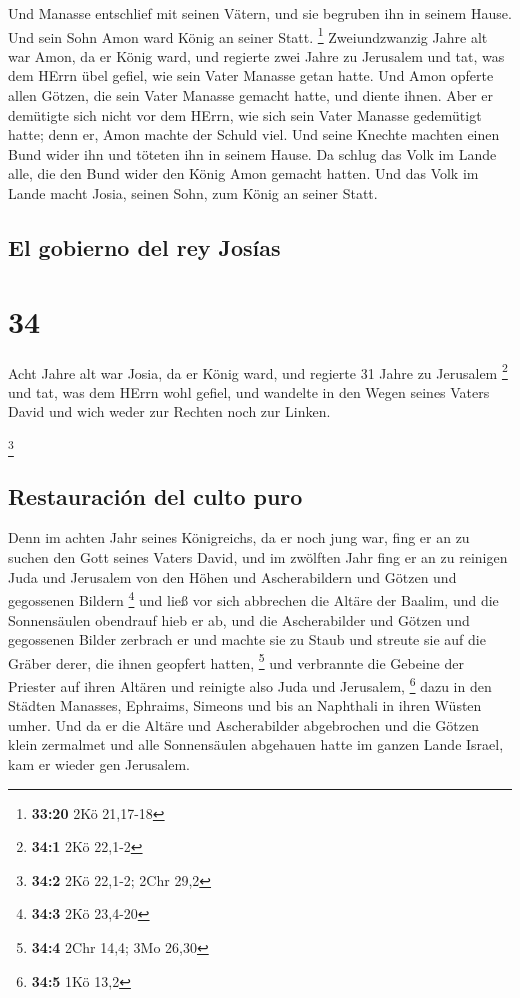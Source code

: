  Und Manasse entschlief mit seinen Vätern, und sie
begruben ihn in seinem Hause. Und sein Sohn Amon ward König an seiner
Statt. \footnote{\textbf{33:20} 2Kö 21,17-18} 
Zweiundzwanzig Jahre alt war Amon, da er König ward, und regierte zwei
Jahre zu Jerusalem  und tat, was dem HErrn übel gefiel,
wie sein Vater Manasse getan hatte. Und Amon opferte allen Götzen, die
sein Vater Manasse gemacht hatte, und diente ihnen.  Aber
er demütigte sich nicht vor dem HErrn, wie sich sein Vater Manasse
gedemütigt hatte; denn er, Amon machte der Schuld viel. 
Und seine Knechte machten einen Bund wider ihn und töteten ihn in seinem
Hause.  Da schlug das Volk im Lande alle, die den Bund
wider den König Amon gemacht hatten. Und das Volk im Lande macht Josia,
seinen Sohn, zum König an seiner Statt.

\hypertarget{el-gobierno-del-rey-josuxedas}{%
\subsection{El gobierno del rey
Josías}\label{el-gobierno-del-rey-josuxedas}}

\hypertarget{section-33}{%
\section{34}\label{section-33}}

 Acht Jahre alt war Josia, da er König ward, und regierte
31 Jahre zu Jerusalem \footnote{\textbf{34:1} 2Kö 22,1-2} 
und tat, was dem HErrn wohl gefiel, und wandelte in den Wegen seines
Vaters David und wich weder zur Rechten noch zur Linken.

\footnote{\textbf{34:2} 2Kö 22,1-2; 2Chr 29,2}

\hypertarget{restauraciuxf3n-del-culto-puro}{%
\subsection{Restauración del culto
puro}\label{restauraciuxf3n-del-culto-puro}}

 Denn im achten Jahr seines Königreichs, da er noch jung
war, fing er an zu suchen den Gott seines Vaters David, und im zwölften
Jahr fing er an zu reinigen Juda und Jerusalem von den Höhen und
Ascherabildern und Götzen und gegossenen Bildern \footnote{\textbf{34:3}
  2Kö 23,4-20}  und ließ vor sich abbrechen die Altäre der
Baalim, und die Sonnensäulen obendrauf hieb er ab, und die Ascherabilder
und Götzen und gegossenen Bilder zerbrach er und machte sie zu Staub und
streute sie auf die Gräber derer, die ihnen geopfert hatten, \footnote{\textbf{34:4}
  2Chr 14,4; 3Mo 26,30}  und verbrannte die Gebeine der
Priester auf ihren Altären und reinigte also Juda und Jerusalem,
\footnote{\textbf{34:5} 1Kö 13,2}  dazu in den Städten
Manasses, Ephraims, Simeons und bis an Naphthali in ihren Wüsten umher.
 Und da er die Altäre und Ascherabilder abgebrochen und
die Götzen klein zermalmet und alle Sonnensäulen abgehauen hatte im
ganzen Lande Israel, kam er wieder gen Jerusalem.

